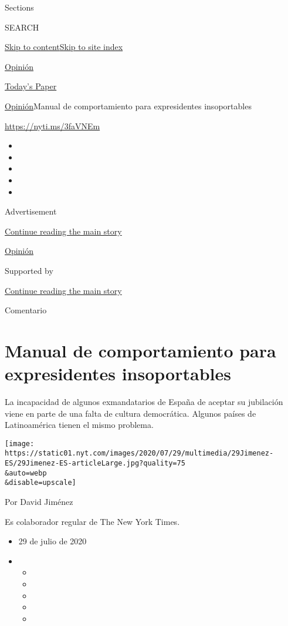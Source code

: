 Sections

SEARCH

\protect\hyperlink{site-content}{Skip to
content}\protect\hyperlink{site-index}{Skip to site index}

\href{https://www.nytimes.com/es/section/opinion}{Opinión}

\href{https://myaccount.nytimes.com/auth/login?response_type=cookie\&client_id=vi}{}

\href{https://www.nytimes.com/section/todayspaper}{Today's Paper}

\href{/es/section/opinion}{Opinión}\textbar{}Manual de comportamiento
para expresidentes insoportables

\url{https://nyti.ms/3faVNEm}

\begin{itemize}
\item
\item
\item
\item
\item
\end{itemize}

Advertisement

\protect\hyperlink{after-top}{Continue reading the main story}

\href{/es/section/opinion}{Opinión}

Supported by

\protect\hyperlink{after-sponsor}{Continue reading the main story}

Comentario

\hypertarget{manual-de-comportamiento-para-expresidentes-insoportables}{%
\section{Manual de comportamiento para expresidentes
insoportables}\label{manual-de-comportamiento-para-expresidentes-insoportables}}

La incapacidad de algunos exmandatarios de España de aceptar su
jubilación viene en parte de una falta de cultura democrática. Algunos
países de Latinoamérica tienen el mismo problema.

\texttt{[image: https://static01.nyt.com/images/2020/07/29/multimedia/29Jimenez-ES/29Jimenez-ES-articleLarge.jpg?quality=75\\\&auto=webp\\\&disable=upscale]}

Por David Jiménez

Es colaborador regular de The New York Times.

\begin{itemize}
\item
  29 de julio de 2020
\item
  \begin{itemize}
  \item
  \item
  \item
  \item
  \item
  \end{itemize}
\end{itemize}


